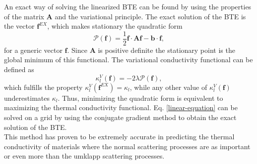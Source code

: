 An exact way of solving the linearized BTE can be found by using the properties of the matrix $\mathbf{A}$ and the variational principle. The exact solution of the BTE is the vector $\mathbf{f}^{EX}$, which makes stationary 
the quadratic form\cite{klemens1958thermal}
\begin{equation}
 \mathcal{P}(\mathbf{f})=\frac{1}{2}\mathbf{f}\cdot\mathbf{A}\mathbf{f}-\mathbf{b}\cdot\mathbf{f},
\end{equation}
for a generic vector $\mathbf{f}$. Since $\mathbf{A}$ is positive definite the stationary point is the global minimum of this functional. The variational conductivity functional can be defined as
\begin{equation}
 \kappa_{l}^{V}(\mathbf{f})=-2\lambda\mathcal{P}(\mathbf{f}),
\end{equation}
which fulfills the property $\kappa_{l}^{V}(\mathbf{f}^{EX})=\kappa_{l}$, while any other value of $\kappa_{l}^{V}(\mathbf{f})$ underestimates $\kappa_{l}$. Thus, minimizing the quadratic form is equivalent to 
maximizing the thermal conductivity functional. Eq. \ref{linear-equation} can be solved on a grid\cite{fugallo2013ab} by using the conjugate gradient method to obtain the exact solution of the BTE. \\

This method has proven to be extremely accurate in predicting the thermal conductivity of materials where the normal scattering processes are as important or even more than the umklapp scattering 
processes\cite{fugallo2014thermal,cepellotti2015phonon}. 
